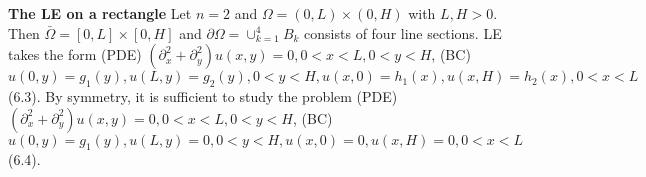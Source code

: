 {\bf The LE on a rectangle}
Let $n=2$ and $\Omega = (0,L) \times (0,H)$ with $L, H >0$. Then $\bar{\Omega} = [0,L] \times [0,H]$ and $\partial \Omega = \cup_{k=1}^4 B_k$ consists of four line sections.   LE takes the form (PDE) $(\partial_x^2 + \partial_y^2) u(x,y) = 0, 0 < x < L, 0 < y < H$, (BC) $u(0,y) = g_1(y), u(L,y)=g_2(y), 0 < y < H, u(x,0)=h_1(x), u(x,H)=h_2(x), 0 < x < L$ (6.3).  By symmetry, it is sufficient to study the problem 
(PDE) $(\partial_x^2 + \partial_y^2) u(x,y) = 0, 0 < x < L, 0 < y < H$, (BC) $u(0,y) = g_1(y), u(L,y)=0, 0 < y < H, u(x,0)=0, u(x,H)=0, 0 < x < L$ (6.4). 
